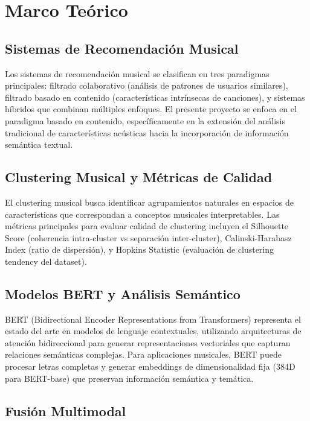 \documentclass[12pt,a4paper]{article}
\begin{document}
\section{Marco Teórico}

\subsection{Sistemas de Recomendación Musical}

Los sistemas de recomendación musical se clasifican en tres paradigmas principales: filtrado colaborativo (análisis de patrones de usuarios similares), filtrado basado en contenido (características intrínsecas de canciones), y sistemas híbridos que combinan múltiples enfoques. El presente proyecto se enfoca en el paradigma basado en contenido, específicamente en la extensión del análisis tradicional de características acústicas hacia la incorporación de información semántica textual.

\subsection{Clustering Musical y Métricas de Calidad}

El clustering musical busca identificar agrupamientos naturales en espacios de características que correspondan a conceptos musicales interpretables. Las métricas principales para evaluar calidad de clustering incluyen el Silhouette Score (coherencia intra-cluster vs separación inter-cluster), Calinski-Harabasz Index (ratio de dispersión), y Hopkins Statistic (evaluación de clustering tendency del dataset).

\subsection{Modelos BERT y Análisis Semántico}

BERT (Bidirectional Encoder Representations from Transformers) representa el estado del arte en modelos de lenguaje contextuales, utilizando arquitecturas de atención bidireccional para generar representaciones vectoriales que capturan relaciones semánticas complejas. Para aplicaciones musicales, BERT puede procesar letras completas y generar embeddings de dimensionalidad fija (384D para BERT-base) que preservan información semántica y temática.

\subsection{Fusión Multimodal}
\end{document}
